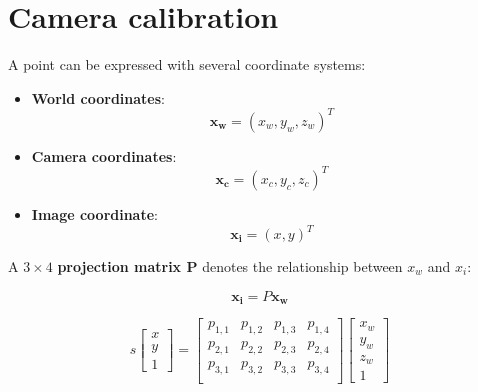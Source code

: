 \documentclass{article}
\begin{document}
\newpage

\section*{Camera calibration}

A point can be expressed with several coordinate systems:

\begin{itemize}
    \item \textbf{World coordinates}:
    \begin{equation*}
        \boldsymbol{x_w} = (x_w, y_w, z_w)^T
    \end{equation*}
    \item \textbf{Camera coordinates}:
    \begin{equation*}
        \boldsymbol{x_c} = (x_c, y_c, z_c)^T
    \end{equation*}
    \item \textbf{Image coordinate}:
    \begin{equation*}
         \boldsymbol{x_i} = (x, y) ^ T
    \end{equation*}
\end{itemize}

A $3\times 4$ \textbf{projection matrix P} denotes the relationship between $x_w$ and $x_i$:

\begin{equation*}
    \boldsymbol{x_i} = P\boldsymbol{x_w}
\end{equation*}

\begin{equation*}
    s\begin{bmatrix}
        x \\ y \\ 1
    \end{bmatrix} = \begin{bmatrix}
        p_{1, 1} & p_{1, 2} & p_{1, 3} & 
        p_{1, 4} \\
        p_{2, 1} & p_{2, 2} & p_{2, 3} & 
        p_{2, 4} \\
        p_{3, 1} & p_{3, 2} & p_{3, 3} & 
        p_{3, 4} \\
    \end{bmatrix}
    \begin{bmatrix}
        x_w \\ y_w \\ z_w \\ 1
    \end{bmatrix}
\end{equation*}
\end{document}
